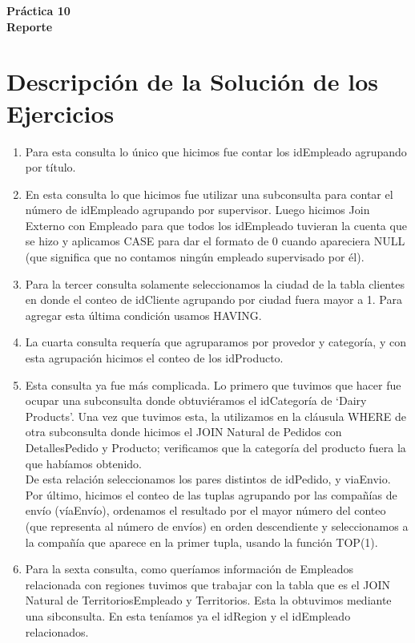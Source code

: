 \documentclass[11pt]{article}
\begin{document}
\begin{center}
	\LARGE{\textbf{Práctica 10\\Reporte}}
\end{center}

\section*{Descripción de la Solución de los Ejercicios}
\begin{enumerate}[label=\arabic*.]
\item Para esta consulta lo único que hicimos fue contar los idEmpleado agrupando por título.
\item En esta consulta lo que hicimos fue utilizar una subconsulta para contar el número de idEmpleado agrupando por supervisor. Luego hicimos Join Externo con Empleado para que todos los idEmpleado tuvieran la cuenta que se hizo y aplicamos CASE para dar el formato de 0 cuando apareciera NULL (que significa que no contamos ningún empleado supervisado por él).
\item Para la tercer consulta solamente seleccionamos la ciudad de la tabla clientes en donde el conteo de idCliente agrupando por ciudad fuera mayor a 1. Para agregar esta última condición usamos HAVING.
\item La cuarta consulta requería que agruparamos por provedor y categoría, y con esta agrupación hicimos el conteo de los idProducto.
\item Esta consulta ya fue más complicada. Lo primero que tuvimos que hacer fue ocupar una subconsulta donde obtuviéramos el idCategoría de `Dairy Products'. Una vez que tuvimos esta, la utilizamos en la cláusula WHERE de otra subconsulta donde hicimos el JOIN Natural de Pedidos con DetallesPedido y Producto; verificamos que la categoría del producto fuera la que habíamos obtenido.\\
De esta relación seleccionamos los pares distintos de idPedido, y viaEnvio. Por último, hicimos el conteo de las tuplas agrupando por las compañías de envío (víaEnvío), ordenamos el resultado por el mayor número del conteo (que representa al número de envíos) en orden descendiente y seleccionamos a la compañía que aparece en la primer tupla, usando la función TOP(1).
\item Para la sexta consulta, como queríamos información de Empleados relacionada con regiones tuvimos que trabajar con la tabla que es el JOIN Natural de TerritoriosEmpleado y Territorios. Esta la obtuvimos mediante una sibconsulta. En esta teníamos ya el idRegion y el idEmpleado relacionados. \\

\end{enumerate}
\end{document}
